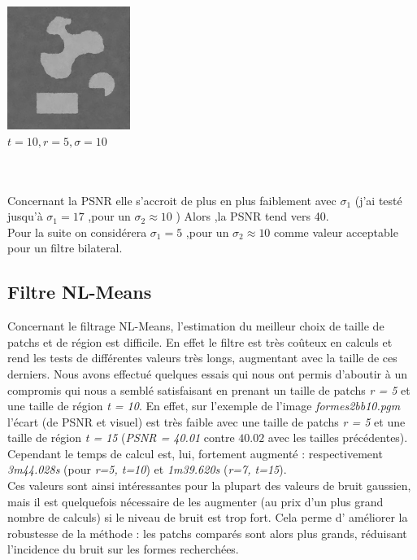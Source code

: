 \documentclass[a4,12pt]{article}
\begin{document}
\begin{minipage}[c]{0.33\linewidth}
	\begin{center}
		\includegraphics[width = 40mm]{./img/formbb25Bil5_20.jpg}\\
		\textit{$t=10, r=5, \sigma=10$}\\
	\end{center}
\end{minipage}\\
\\
Concernant la PSNR elle s'accroit de plus en plus faiblement avec $\sigma_1$ (j'ai testé jusqu'à $\sigma_1 = 17$ ,pour un $\sigma_2 \approx 10$ )
Alors ,la PSNR tend vers 40.\\
Pour la suite on considérera  $\sigma_1 = 5$ ,pour un $\sigma_2 \approx 10$ comme valeur acceptable pour un filtre bilateral.

\subsection{Filtre NL-Means}
Concernant le filtrage NL-Means, l'estimation du meilleur choix de taille de patchs et de région est difficile. En effet le filtre est très coûteux en calculs et rend les tests de différentes valeurs très longs, augmentant avec la taille de ces derniers. Nous avons effectué quelques essais qui nous ont permis d'aboutir à un compromis qui nous a semblé satisfaisant en prenant un taille de patchs \textit{r = 5} et une taille de région \textit{t = 10}. En effet, sur l'exemple de l'image \textit{formes2bb10.pgm} l'écart (de PSNR et visuel) est très faible avec une taille de patchs \textit{r = 5} et une taille de région \textit{t = 15} (\textit{PSNR = 40.01} contre $40.02$ avec les tailles précédentes). Cependant le temps de calcul est, lui, fortement augmenté : respectivement \textit{3m44.028s} (pour \textit{r=5, t=10}) et \textit{1m39.620s} (\textit{r=7, t=15}).\\

Ces valeurs sont ainsi intéressantes pour la plupart des valeurs de bruit gaussien, mais il est quelquefois nécessaire de les augmenter (au prix d'un plus grand nombre de calculs) si le niveau de bruit est trop fort. Cela perme d' améliorer la robustesse de la méthode : les patchs comparés sont alors plus grands, réduisant l'incidence du bruit sur les formes recherchées.\\
\end{document}
